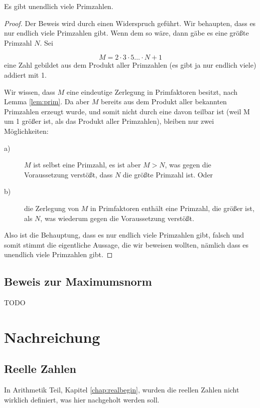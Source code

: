 \begin{theorem}
Es gibt unendlich viele Primzahlen.
\end{theorem}
\begin{proof}
Der Beweis wird durch einen Widerspruch geführt. Wir behaupten, dass es nur endlich viele Primzahlen gibt. Wenn dem so wäre, dann gäbe es eine größte Primzahl $N$. Sei

\[ M = 2\cdot 3\cdot 5\dots \cdot N +1 \]
eine Zahl gebildet aus dem Produkt aller Primzahlen (es gibt ja nur endlich viele) addiert mit 1.

Wir wissen, dass $M$ eine eindeutige Zerlegung in Primfaktoren besitzt, nach Lemma \ref{lem:prim}. Da aber $M$ bereits aus dem Produkt aller bekannten Primzahlen erzeugt wurde, und somit nicht durch eine davon teilbar ist (weil M um 1 größer ist, als das Produkt aller Primzahlen), bleiben nur zwei Möglichkeiten: 

\begin{description}
\item[a)] $M$ ist selbst eine Primzahl, es ist aber $M>N$, was gegen die Voraussetzung verstößt, dass $N$ die größte Primzahl ist. Oder
\item[b)] die Zerlegung von $M$ in Primfaktoren enthält eine Primzahl, die größer ist, als $N$, was wiederum gegen die Voraussetzung verstößt.
\end{description}

Also ist die Behauptung, dass es nur endlich viele Primzahlen gibt, falsch und somit stimmt die eigentliche Aussage, die wir beweisen wollten, nämlich dass es unendlich viele Primzahlen gibt. 
\end{proof}

\subsection{Beweis zur Maximumsnorm}


TODO

\section{Nachreichung}

\subsection{Reelle Zahlen}\label{chap:realfinal}

In Arithmetik Teil, Kapitel \ref{chap:realbegin}, wurden die reellen Zahlen nicht wirklich definiert, was hier nachgeholt werden soll. 

